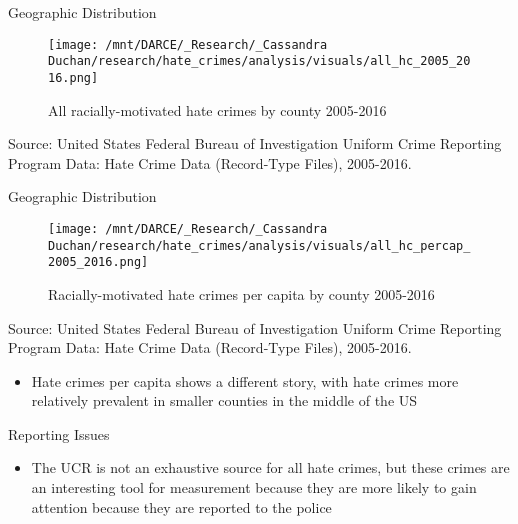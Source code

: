 \documentclass[ignorenonframetext,]{beamer}
\providecommand{\tightlist}{%
  \setlength{\itemsep}{0pt}\setlength{\parskip}{0pt}}
\begin{document}
\begin{frame}{Geographic Distribution}

\begin{figure}
\centering
\texttt{[image: /mnt/DARCE/\_Research/\_Cassandra Duchan/research/hate\_crimes/analysis/visuals/all\_hc\_2005\_2016.png]}
\caption{All racially-motivated hate crimes by county 2005-2016}
\end{figure}

\tiny Source: United States Federal Bureau of Investigation Uniform
Crime Reporting Program Data: Hate Crime Data (Record-Type Files),
2005-2016.

\end{frame}

\begin{frame}{Geographic Distribution}

\begin{figure}
\centering
\texttt{[image: /mnt/DARCE/\_Research/\_Cassandra Duchan/research/hate\_crimes/analysis/visuals/all\_hc\_percap\_2005\_2016.png]}
\caption{Racially-motivated hate crimes per capita by county 2005-2016}
\end{figure}

\tiny Source: United States Federal Bureau of Investigation Uniform
Crime Reporting Program Data: Hate Crime Data (Record-Type Files),
2005-2016.

\begin{itemize}
\tightlist
\item
  Hate crimes per capita shows a different story, with hate crimes more
  relatively prevalent in smaller counties in the middle of the US
\end{itemize}

\end{frame}

\begin{frame}{Reporting Issues}

\begin{itemize}
\tightlist
\item
  The UCR is not an exhaustive source for all hate crimes, but these
  crimes are an interesting tool for measurement because they are more
  likely to gain attention because they are reported to the police
\end{itemize}

\end{frame}
\end{document}
